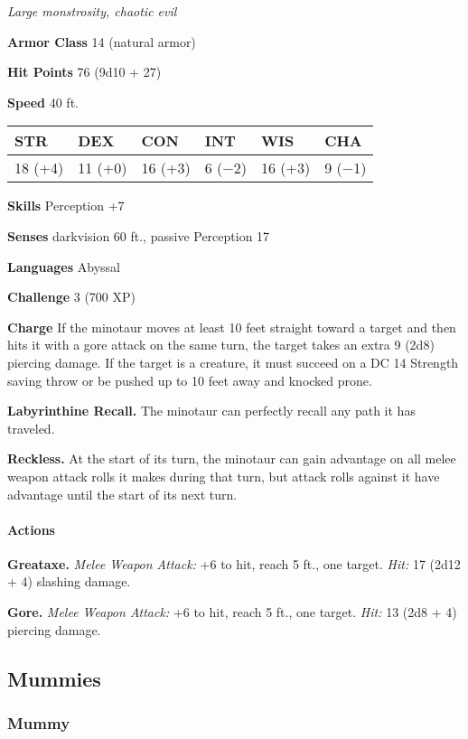 \documentclass[
]{article}
\begin{document}
\emph{Large monstrosity, chaotic evil}

\textbf{Armor Class} 14 (natural armor)

\textbf{Hit Points} 76 (9d10 + 27)

\textbf{Speed} 40 ft.

\begin{longtable}[]{@{}llllll@{}}
\toprule
STR & DEX & CON & INT & WIS & CHA\tabularnewline
\midrule
\endhead
18 (+4) & 11 (+0) & 16 (+3) & 6 (−2) & 16 (+3) & 9 (−1)\tabularnewline
\bottomrule
\end{longtable}

\textbf{Skills} Perception +7

\textbf{Senses} darkvision 60 ft., passive Perception 17

\textbf{Languages} Abyssal

\textbf{Challenge} 3 (700 XP)

\textbf{Charge} If the minotaur moves at least 10 feet straight toward a
target and then hits it with a gore attack on the same turn, the target
takes an extra 9 (2d8) piercing damage. If the target is a creature, it
must succeed on a DC 14 Strength saving throw or be pushed up to 10 feet
away and knocked prone.

\textbf{Labyrinthine Recall.} The minotaur can perfectly recall any path
it has traveled.

\textbf{Reckless.} At the start of its turn, the minotaur can gain
advantage on all melee weapon attack rolls it makes during that turn,
but attack rolls against it have advantage until the start of its next
turn.

\hypertarget{actions-10}{%
\paragraph{Actions}\label{actions-10}}

\textbf{Greataxe.} \emph{Melee Weapon Attack:} +6 to hit, reach 5 ft.,
one target. \emph{Hit:} 17 (2d12 + 4) slashing damage.

\textbf{Gore.} \emph{Melee Weapon Attack:} +6 to hit, reach 5 ft., one
target. \emph{Hit:} 13 (2d8 + 4) piercing damage.

\hypertarget{mummies}{%
\subsection{Mummies}\label{mummies}}

\hypertarget{mummy}{%
\subsubsection{Mummy}\label{mummy}}
\end{document}
